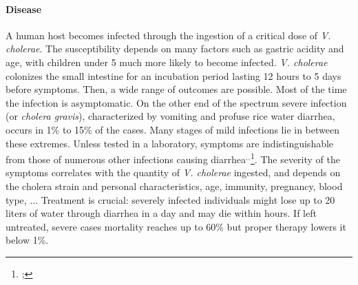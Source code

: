 \paragraph{Disease} A human host becomes infected through the ingestion of a critical dose of \emph{V. cholerae}\cite{Kaper:Cholera:1995}\cite{Nelson:CholeraTransmissionHost:2009}. The susceptibility depends on many factors such as gastric acidity and age, with children under 5 much more likely to become infected\cite{Sack:Cholera:2004}. \textit{V. cholerae} colonizes the small intestine for an incubation period lasting 12 hours to 5 days\cite{Azman:IncubationPeriodCholera:2013} before symptoms. Then, a wide range of outcomes are possible. Most of the time the infection is asymptomatic. On the other end of the spectrum severe infection (or \emph{cholera gravis}), characterized by vomiting and profuse rice water diarrhea, occurs in 1\% to 15\% of the cases. Many stages of mild infections lie in between these extremes. Unless tested in a laboratory, symptoms are indistinguishable from those of numerous other infections causing diarrhea\footnotemark[17]$^{,}$\footnotemark[18]$^{,}$\footnote{;%
}.  The severity of the symptoms correlates with the quantity of \textit{V. cholerae} ingested\cite{Brouwer:DoseresponseRelationshipsEnvironmentally:2017}, and depends on the cholera strain and personal characteristics, age, immunity, pregnancy, blood type\cite{WHO:CholeraVaccinesWHO:2017,Azman:IncubationPeriodCholera:2013}, ...%
 Treatment is crucial: severely infected individuals might lose up to 20 liters of water through diarrhea in a day and may die within hours. If left untreated, severe cases mortality reaches up to 60\% but proper therapy lowers it below 1\%\cite{Luquero:MortalityRatesCholera:2016}.

